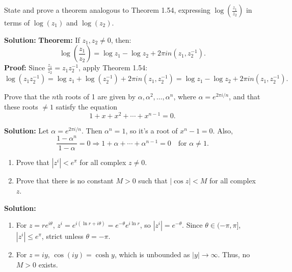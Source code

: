 \begin{problembox}
State and prove a theorem analogous to Theorem 1.54, expressing \( \log\left( \frac{z_1}{z_2} \right) \) in terms of \( \log(z_1) \) and \( \log(z_2) \).
\end{problembox}

\textbf{Solution:}
\textbf{Theorem:} If \( z_1, z_2 \neq 0 \), then:
\[
\log\left( \frac{z_1}{z_2} \right) = \log z_1 - \log z_2 + 2\pi i n(z_1, z_2^{-1}).
\]
\textbf{Proof:}
Since \( \frac{z_1}{z_2} = z_1 z_2^{-1} \), apply Theorem 1.54:
\[
\log(z_1 z_2^{-1}) = \log z_1 + \log(z_2^{-1}) + 2\pi i n(z_1, z_2^{-1}) = \log z_1 - \log z_2 + 2\pi i n(z_1, z_2^{-1}).
\]

\begin{problembox}
Prove that the \( n \)th roots of 1 are given by \( \alpha, \alpha^2, \ldots, \alpha^n \), where \( \alpha = e^{2\pi i/n} \), and that these roots \( \ne 1 \) satisfy the equation
\[
1 + x + x^2 + \cdots + x^{n-1} = 0.
\]
\end{problembox}

\textbf{Solution:}
Let \( \alpha = e^{2\pi i/n} \). Then \( \alpha^n = 1 \), so it's a root of \( x^n - 1 = 0 \). Also,
\[
\frac{1 - \alpha^n}{1 - \alpha} = 0 \Rightarrow 1 + \alpha + \cdots + \alpha^{n-1} = 0 \quad \text{for } \alpha \ne 1.
\]

\begin{problembox}
\begin{enumerate}[label=\alph*)]
\item Prove that \( |z^i| < e^{\pi} \) for all complex \( z \ne 0 \).
\item Prove that there is no constant \( M > 0 \) such that \( |\cos z| < M \) for all complex \( z \).
\end{enumerate}
\end{problembox}

\textbf{Solution:}
\begin{enumerate}[label=\alph*)]
\item For \( z = re^{i\theta} \), \( z^i = e^{i(\ln r + i\theta)} = e^{-\theta} e^{i \ln r} \), so \( |z^i| = e^{-\theta} \). Since \( \theta \in (-\pi, \pi] \), \( |z^i| \leq e^{\pi} \), strict unless \( \theta = -\pi \).
\item For \( z = iy \), \( \cos(iy) = \cosh y \), which is unbounded as \( |y| \to \infty \). Thus, no \( M > 0 \) exists.
\end{enumerate}

